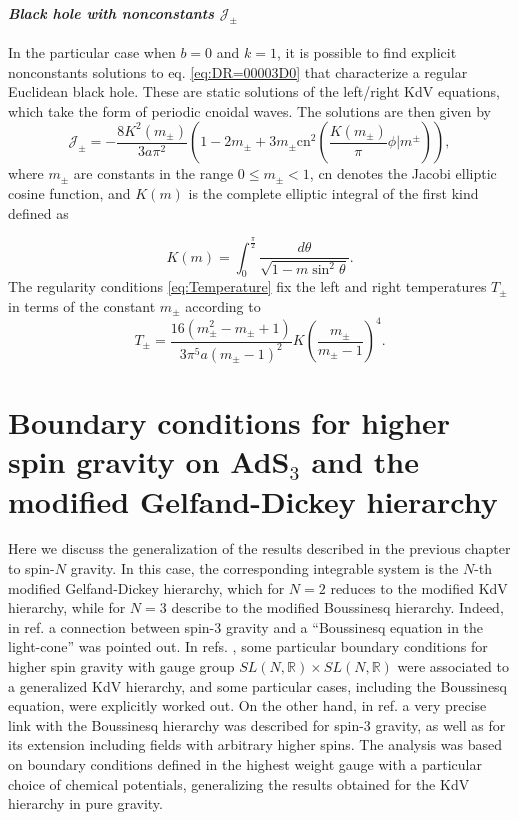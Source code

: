 \documentclass[letterpaper,11pt,oneside]{book}
\begin{document}
\subsubsection*{\emph{Black hole with nonconstants $\mathcal{J_{\pm}}$}}

In the particular case when $b=0$ and $k=1$, it is possible to find
explicit nonconstants solutions to eq. \eqref{eq:DR=00003D0} that
characterize a regular Euclidean black hole. These are static solutions
of the left/right KdV equations, which take the form of periodic cnoidal
waves. The solutions are then given by
\begin{equation}
	\mathcal{J_{\pm}}=-\frac{8K^{2}\left(m_{\pm}\right)}{3a\pi^{2}}\left(1-2m_{\pm}+3m_{\pm}\text{cn}^{2}\left(\frac{K\left(m_{\pm}\right)}{\pi}\phi|m^{\pm}\right)\right),
\end{equation}
where $m_{\pm}$ are constants in the range $0\leq m_{\pm}<1$, $\text{cn}$
denotes the Jacobi elliptic cosine function, and $K\left(m\right)$
is the complete elliptic integral of the first kind defined as

\begin{equation}
	K(m)=\int_{0}^{\frac{\pi}{2}}\frac{d\theta}{\sqrt{1-m\sin^{2}\theta}}.
\end{equation}
The regularity conditions \eqref{eq:Temperature} fix the left and
right temperatures $T_{\pm}$ in terms of the constant $m_{\pm}$
according to
\[
T_{\pm}=\frac{16\left(m_{\pm}^{2}-m_{\pm}+1\right)}{3\pi^{5}a\left(m_{\pm}-1\right)^{2}}K\left(\frac{m_{\pm}}{m_{\pm}-1}\right)^{4}.
\]

\newpage{}


\chapter{Boundary conditions for higher spin gravity on AdS$_{3}$ and the modified Gelfand-Dickey hierarchy  \label{chapter:Gelfand-Dickey hierarchy Part}}

Here we discuss the generalization of the results described in the previous chapter to spin-$N$ gravity. In this case, the corresponding integrable system is the $N$-th modified Gelfand-Dickey hierarchy, which for $N=2$ reduces to the modified KdV hierarchy, while for $N=3$ describe to the modified Boussinesq hierarchy. Indeed, in ref. \cite{Compere:2013gja} a connection between spin-3 gravity
and a ``Boussinesq equation in the light-cone'' was pointed out.
In refs. \cite{Gutperle:2014aja,Beccaria:2015iwa}, some particular
boundary conditions for higher spin gravity with gauge group $SL(N,\mathbb{R})\times SL(N,\mathbb{R})$
were associated to a generalized KdV hierarchy, and some particular
cases, including the Boussinesq equation, were explicitly worked out.
On the other hand, in ref. \cite{Perez:2016vqo} a very precise link
with the Boussinesq hierarchy was described for spin-3 gravity, as
well as for its extension including fields with arbitrary higher spins.
The analysis was based on boundary conditions defined in the highest
weight gauge with a particular choice of chemical potentials, generalizing
the results obtained for the KdV hierarchy in pure gravity.
\end{document}
